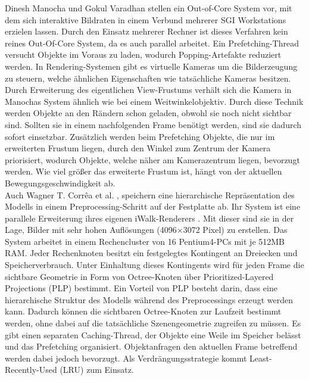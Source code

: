 Dinesh Manocha und Gokul Varadhan \cite{manocha} stellen ein Out-of-Core System vor, mit dem sich interaktive Bildraten in einem Verbund mehrerer SGI Workstations erzielen lassen. Durch den Einsatz mehrerer Rechner ist dieses Verfahren kein reines Out-Of-Core System, da es auch parallel arbeitet. Ein Prefetching-Thread versucht Objekte im Voraus zu laden, wodurch Popping-Artefakte reduziert werden. In Rendering-Systemen gibt es virtuelle Kameras um die Bilderzeugung zu steuern,  welche ähnlichen Eigenschaften wie tatsächliche Kameras besitzen. Durch Erweiterung des eigentlichen View-Frustums verhält sich die Kamera in Manochas System ähnlich wie bei einem Weitwinkelobjektiv. Durch diese Technik werden Objekte an den Rändern schon geladen, obwohl sie noch nicht sichtbar sind. Sollten sie in einem nachfolgenden Frame benötigt werden, sind sie dadurch sofort einsetzbar. Zusätzlich werden beim Prefetching Objekte, die nur im erweiterten Frustum liegen, durch den Winkel zum Zentrum der Kamera priorisiert, wodurch Objekte, welche näher am Kamerazentrum liegen, bevorzugt werden. Wie viel größer das erweiterte Frustum ist, hängt von der aktuellen Bewegungsgeschwindigkeit ab.\\
Auch Wagner T. Corr\^{e}a et al. \cite{wagner1}, \cite{wagner2} speichern eine hierarchische Repräsentation des Modells in einem Preprocessing-Schritt auf der Festplatte ab. Ihr System ist eine parallele Erweiterung ihres eigenen iWalk-Renderers \cite{iwalk}. Mit dieser sind sie in der Lage, Bilder mit sehr hohen Auflösungen (4096$\times$3072 Pixel) zu erstellen. Das System arbeitet in einem Rechencluster von 16 Pentium4-PCs mit je 512MB RAM. Jeder Rechenknoten besitzt ein festgelegtes Kontingent an Dreiecken und Speicherverbrauch. Unter Einhaltung dieses Kontingents wird für jeden Frame die sichtbare Geometrie in Form von Octree-Knoten über Prioritized-Layered Projections (PLP) \cite{plp} bestimmt. Ein Vorteil von PLP besteht darin, dass eine hierarchische Struktur des Modells während des Preprocessings erzeugt werden kann. Dadurch können die sichtbaren Octree-Knoten zur Laufzeit bestimmt werden, ohne dabei auf die tatsächliche Szenengeometrie zugreifen zu müssen. Es gibt einen separaten Caching-Thread, der Objekte eine Weile im Speicher belässt und das Prefetching organisiert. Objektanfragen den aktuellen Frame betreffend werden dabei jedoch bevorzugt. Als Verdrängungsstrategie kommt Least-Recently-Used (LRU) zum Einsatz.\\
